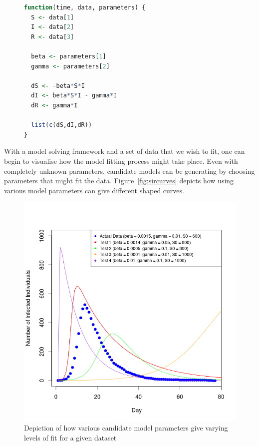 \documentclass[11pt, a4paper, oneside,titlepage]{article}
\begin{document}
\begin{center}
\begin{figure}[ht!]
\centering
\begin{lstlisting}[language=R, style=customc]
function(time, data, parameters) {
  S <- data[1]
  I <- data[2]
  R <- data[3]

  beta <- parameters[1]
  gamma <- parameters[2]

  dS <- -beta*S*I
  dI <- beta*S*I - gamma*I
  dR <- gamma*I

  list(c(dS,dI,dR))
}
\end{lstlisting}
\label{sirR}
\end{figure}
\end{center}

With a model solving framework and a set of data that we wish to fit,
one can begin to visualise how the model fitting process might take
place. Even with completely unknown parameters, candidate models can
be generating by choosing parameters that might fit the data. Figure~\ref{fig:sircurves} depicts how using various model parameters can give different
shaped curves. 

\begin{center}
\begin{figure}[ht!]

\includegraphics[width=15cm]{Rplot01.png}
\caption{Depiction of how various candidate model parameters give
  varying levels of fit for a given dataset}
\label{sircurves}
\end{figure}  
\end{center}
\end{document}
